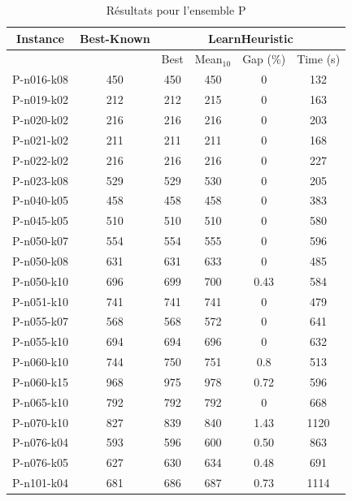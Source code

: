 \documentclass[a4paper,11pt]{article}%
\begin{document}
\begin{table}[p]
\caption{Résultats pour l'ensemble P}
\label{TP}
\begin{center}
\begin{tabular}{|@{}c@{}|@{}c@{}|@{}c@{}|@{}c@{}|@{}c@{}|@{}c@{}|}

\hline
 Instance & Best-Known & \multicolumn{4}{c|}{LearnHeuristic}  \\
 \hline
 & & Best & Mean$_{10}$ & Gap (\%) & Time (s) \\ 
 \hline
 P-n016-k08 & 450 & 450 & 450 & 0 & 132  \\
 \hline
 P-n019-k02   & 212 & 212 & 215 & 0 & 163   \\
  \hline
   P-n020-k02 & 216 & 216 & 216 &0 & 203  \\
 \hline
   P-n021-k02 & 211 & 211 & 211 &0 & 168  \\
  \hline
   P-n022-k02 & 216 & 216 & 216 & 0 & 227  \\
 \hline
  P-n023-k08  & 529 & 529 & 530 & 0 & 205 \\
  \hline
  P-n040-k05 & 458 & 458 & 458 & 0 & 383 \\
 \hline
  P-n045-k05  & 510 & 510 & 510 & 0 & 580 \\
 \hline
 P-n050-k07 & 554 & 554 & 555 & 0 & 596 \\
 \hline
  P-n050-k08  & 631 & 631 & 633 & 0 & 485   \\
 \hline
   P-n050-k10 & 696 & 699 & 700 & 0.43 & 584   \\
  \hline
   P-n051-k10 & 741 & 741 & 741 & 0 & 479  \\
 \hline 
  P-n055-k07  & 568 & 568 & 572& 0 & 641  \\
  \hline
  P-n055-k10  & 694 & 694 & 696 &0 & 632  \\
  \hline
  P-n060-k10 & 744 & 750 & 751 & 0.8 & 513  \\
 \hline
   P-n060-k15  & 968 & 975 & 978 & 0.72 &596   \\
  \hline
  P-n065-k10  & 792 & 792 & 792 & 0 &  668   \\
  \hline
  P-n070-k10 & 827 & 839 & 840 & 1.43 &1120    \\
  \hline
  P-n076-k04 & 593 & 596 &600 & 0.50 & 863 \\
 \hline 
   P-n076-k05 & 627 & 630 & 634 &0.48 & 691   \\
  \hline 
  P-n101-k04  & 681 & 686 & 687 & 0.73 & 1114  \\
  \hline
\end{tabular}
\end{center}
\end{table}
\end{document}
